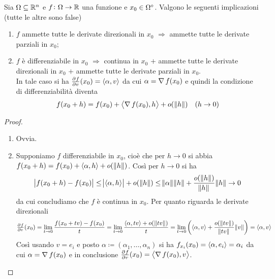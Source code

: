 \begin{thm} \label{thm:diff}
	Sia $ \Omega \subseteq \R^n $ e $ f \colon \Omega \to \R $ una funzione e $ x_0 \in \ouv{\Omega} $. Valgono le seguenti implicazioni (tutte le altre sono false)
	\begin{enumerate}[label = (\roman*)]
		\item $ f $ ammette tutte le derivate direzionali in $ x_0 $ $ \Rightarrow $ ammette tutte le derivate parziali in $ x_0 $;
		\item $ f $ è differenziabile in $ x_0 $ $ \Rightarrow $ continua in $ x_0 $ $ + $ ammette tutte le derivate direzionali in $ x_0 $ $ + $ ammette tutte le derivate parziali in $ x_0 $. \\
		In tale caso si ha $ \pd{f}{v}(x_0) = \sp{\alpha}{v} $ da cui $ \alpha = \grad{f}(x_0) $ e quindi la condizione di differenziabilità diventa
		\begin{equation*}
			f(x_0 + h) = f(x_0) + \sp{\grad{f}(x_0)}{h} + o(\,\norm{h}) \quad (h \to 0)
		\end{equation*}
	\end{enumerate}
\end{thm}
%
\begin{proof}
	\begin{enumerate}[label = (\roman*)]
		\item Ovvia. 
		\item Supponiamo $ f $ differenziabile in $ x_0 $, cioè che per $ h \to 0 $ si abbia $ f(x_0 + h) = f(x_0) + \sp{\alpha}{h} + o(\,\norm{h}) $. Così per $ h \to 0 $ si ha
		\[
			\abs{f(x_0 + h) - f(x_0)} \leq \abs{\sp{\alpha}{h}} + o(\,\norm{h}) \leq \norm{\alpha} \norm{h} + \frac{o(\,\norm{h})}{\norm{h}} \norm{h} \to 0
		\]
		da cui concludiamo che $ f $ è continua in $ x_0 $. Per quanto riguarda le derivate direzionali
		\[
			\pd{f}{v}(x_0) = \lim_{t \to 0} \frac{f(x_0 + tv) - f(x_0)}{t} = \lim_{t \to 0} 	\frac{\sp{\alpha}{tv} + o(\,\norm{tv})}{t} = \lim_{t \to 0} \left(\sp{\alpha}{v} + \frac{o(\,\norm{tv})}{\norm{tv}} \norm{v}\right) = \sp{\alpha}{v} 
		\]
		Così usando $ v = e_i $ e posto $ \alpha \coloneqq (\alpha_1, \ldots, \alpha_n) $ si ha $ f_{x_i}(x_0) = \sp{\alpha}{e_i} = \alpha_i $ da cui $ \alpha = \grad{f}(x_0) $ e in conclusione $ \pd{f}{v}(x_0) = \sp{\grad{f}(x_0)}{v} $. \qedhere
	\end{enumerate}
\end{proof}

